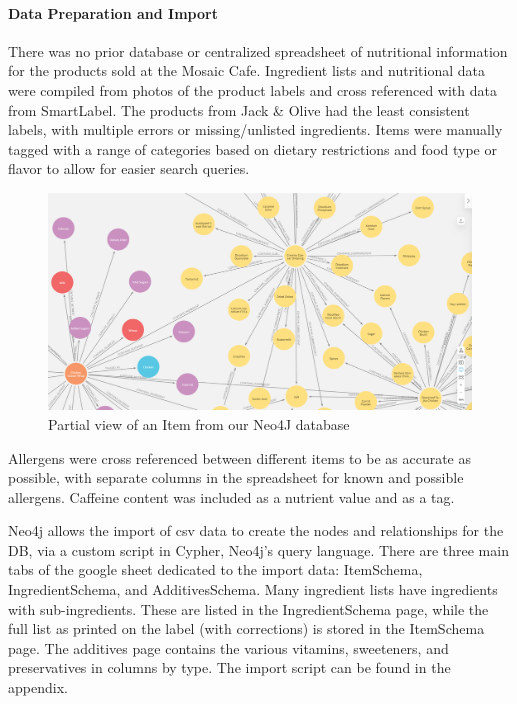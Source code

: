 \documentclass[thesis]{fputhesis}
\begin{document}
\begin{body}
\paragraph{Data Preparation and Import}
There was no prior database or centralized spreadsheet of nutritional information for the products sold at the Mosaic Cafe. Ingredient lists and nutritional data were compiled from photos of the product labels and cross referenced with data from SmartLabel. The products from Jack \& Olive had the least consistent labels, with multiple errors or missing/unlisted ingredients. Items were manually tagged with a range of categories based on dietary restrictions and food type or flavor to allow for easier search queries. 
\begin{figure}[h]
    \centering
    \includegraphics[width=\textwidth]{Images/neo4j.png}
    \caption{Partial view of an Item from our Neo4J database}
    \label{fig:neo4jnodes}
\end{figure}
Allergens were cross referenced between different items to be as accurate as possible, with separate columns in the spreadsheet for known and possible allergens. Caffeine content was included as a nutrient value and as a tag.

Neo4j allows the import of \acrfull{csv} data to create the nodes and relationships for the DB, via a custom script in Cypher, Neo4j's query language. There are three main tabs of the google sheet dedicated to the import data: ItemSchema, IngredientSchema, and AdditivesSchema. Many ingredient lists have ingredients with sub-ingredients. These are listed in the IngredientSchema page, while the full list as printed on the label (with corrections) is stored in the ItemSchema page. The additives page contains the various vitamins, sweeteners, and preservatives in columns by type. The import script can be found in the appendix.


\end{body}
\end{document}
